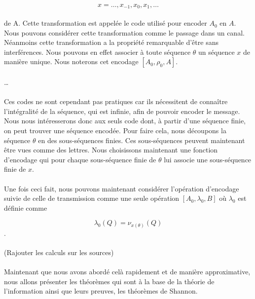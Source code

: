 \documentclass[a4paper,12pt]{article}
\begin{document}
	\[x = \dots,x_{-1},x_{0},x_{1},\dots\]

	\paragraph{}
	de A. Cette transformation est appelée le code utilisé pour encoder $A_0$ en $A$. Nous pouvons considérer cette 
	transformation comme le passage dans un canal. Néanmoins cette transformation a la propriété remarquable d'être 
	sans interférences. Nous pouvons en effet associer à toute séquence $\theta$ un séquence $x$ de manière unique. 
	Nous noterons cet encodage $[A_0,\rho_0,A]$.

	\paragraph{}
	…

	\paragraph{}
	Ces codes ne sont cependant pas pratiques car ils nécessitent de connaître l'intégralité de la séquence, qui est 
	infinie, afin de pouvoir encoder le message. Nous  nous intéresserons donc aux seuls code dont, à partir d'une séquence 
	finie, on peut trouver une séquence encodée. Pour faire cela, nous découpons la séquence $\theta$ en des sous-séquences finies. 
	Ces sous-séquences peuvent maintenant être vues comme des lettres. Nous choisissons maintenant une fonction d'encodage qui pour 
	chaque sous-séquence finie de $\theta$ lui associe une sous-séquence finie de $x$. 

	\paragraph{}
	Une fois ceci fait, nous pouvons maintenant considérer l'opération d'encodage suivie de celle de transmission comme une seule 
	opération $[A_0,\lambda_0,B]$ où $\lambda_0$ est définie comme

	\[\lambda_0(Q)=\nu_{x(\theta)}(Q)\].

	\paragraph{}
	(Rajouter les calculs sur les sources)
	
	\paragraph{}
	Maintenant que nous avons abordé celà rapidement et de manière 
	approximative, nous allons présenter les théorèmes qui sont à la base
	de la théorie de l'information ainsi que leurs preuves, les théorèmes
	de Shannon.
\end{document}
